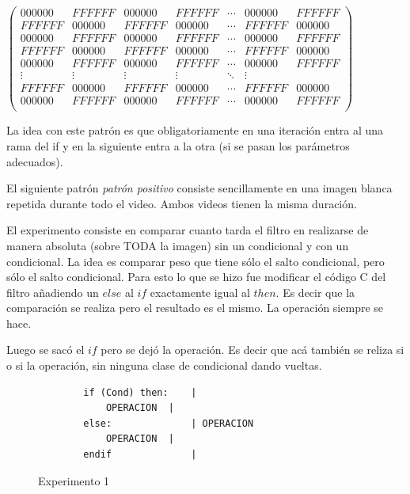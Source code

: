 \begin{center}
$
 \begin{pmatrix}
   000000 & FFFFFF & 000000 & FFFFFF & \cdots & 000000 & FFFFFF \\
   FFFFFF & 000000 & FFFFFF & 000000 & \cdots & FFFFFF & 000000 \\
   000000 & FFFFFF & 000000 & FFFFFF & \cdots & 000000 & FFFFFF \\
   FFFFFF & 000000 & FFFFFF & 000000 & \cdots & FFFFFF & 000000 \\
   000000 & FFFFFF & 000000 & FFFFFF & \cdots & 000000 & FFFFFF \\
   \vdots & \vdots & \vdots  & \vdots  & \ddots & \vdots  \\
   FFFFFF & 000000 & FFFFFF & 000000 & \cdots & FFFFFF & 000000 \\
   000000 & FFFFFF & 000000 & FFFFFF & \cdots & 000000 & FFFFFF \\
\end{pmatrix}
$
\end{center}

	La idea con este patrón es que obligatoriamente en una iteración
entra al una rama del if y en la siguiente entra a la otra (si se pasan
los parámetros adecuados).

	El siguiente patrón \textit{patrón positivo} consiste sencillamente en una
imagen blanca repetida durante todo el video. Ambos videos tienen
la misma duración.

	El experimento consiste en comparar cuanto tarda el filtro
en realizarse de manera absoluta (sobre TODA la imagen) sin un
condicional y con un condicional. La idea es comparar peso que 
tiene sólo el salto condicional, pero sólo el salto condicional. Para esto
lo que se hizo fue modificar el código C del filtro añadiendo un 
$else$ al $if$ exactamente igual al $then$. Es decir que la comparación
se realiza pero el resultado es el mismo. La operación siempre se hace.

	Luego se sacó el $if$ pero se dejó la operación. Es decir que acá
también se reliza si o si la operación, sin ninguna clase de condicional
dando vueltas.


\begin{figure}[h]
	\begin{mdframed}
	\begin{center}
		\begin{lstlisting}
		if (Cond) then:    | 
			OPERACION  | 
		else:              | OPERACION
			OPERACION  |
		endif              |
		\end{lstlisting}
	\end{center}
	\end{mdframed}
	\caption{Experimento 1}
	\label{fig:Experimento Saltos}
\end{figure}

